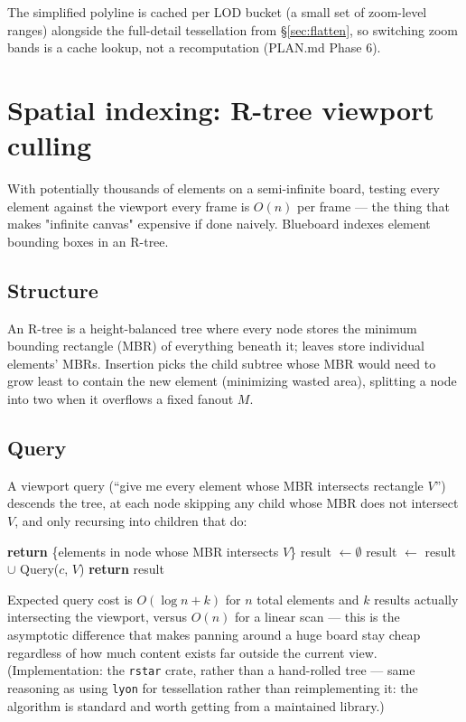 \documentclass[11pt]{article}
\begin{document}
The simplified polyline is cached per LOD bucket (a small set of zoom-level ranges) alongside
the full-detail tessellation from \S\ref{sec:flatten}, so switching zoom bands is a cache
lookup, not a recomputation (PLAN.md Phase 6).

\section{Spatial indexing: R-tree viewport culling}

With potentially thousands of elements on a semi-infinite board, testing every element
against the viewport every frame is $O(n)$ per frame — the thing that makes "infinite
canvas" expensive if done naively. Blueboard indexes element bounding boxes in an R-tree.

\subsection{Structure}
An R-tree is a height-balanced tree where every node stores the minimum bounding rectangle
(MBR) of everything beneath it; leaves store individual elements' MBRs. Insertion picks the
child subtree whose MBR would need to grow least to contain the new element (minimizing
wasted area), splitting a node into two when it overflows a fixed fanout $M$.

\subsection{Query}
A viewport query (``give me every element whose MBR intersects rectangle $V$'') descends the
tree, at each node skipping any child whose MBR does not intersect $V$, and only recursing
into children that do:
\begin{algorithm}[h]
\caption{Query(node, $V$)}
\begin{algorithmic}[1]
  \State \textbf{return} \{elements in node whose MBR intersects $V$\}
\Else
  \State result $\gets \emptyset$
      \State result $\gets$ result $\cup$ Query($c$, $V$)
    \EndIf
  \EndFor
  \State \textbf{return} result
\EndIf
\end{algorithmic}
\end{algorithm}
Expected query cost is $O(\log n + k)$ for $n$ total elements and $k$ results actually
intersecting the viewport, versus $O(n)$ for a linear scan — this is the asymptotic
difference that makes panning around a huge board stay cheap regardless of how much content
exists far outside the current view. (Implementation: the \texttt{rstar} crate, rather than
a hand-rolled tree — same reasoning as using \texttt{lyon} for tessellation rather than
reimplementing it: the algorithm is standard and worth getting from a maintained library.)
\end{document}
